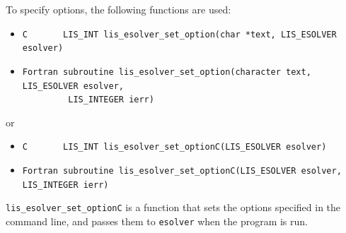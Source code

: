 \documentclass[a4paper]{article}
\begin{document}
To specify options, 
the following functions are used:
\begin{itemize}
\item \verb|C       LIS_INT lis_esolver_set_option(char *text, LIS_ESOLVER esolver)|
\item \verb|Fortran subroutine lis_esolver_set_option(character text, LIS_ESOLVER esolver,|\\
      \verb|         LIS_INTEGER ierr)|
\end{itemize}
or
\begin{itemize}
\item \verb|C       LIS_INT lis_esolver_set_optionC(LIS_ESOLVER esolver)|
\item \verb|Fortran subroutine lis_esolver_set_optionC(LIS_ESOLVER esolver, LIS_INTEGER ierr)|
\end{itemize}
\verb|lis_esolver_set_optionC| is a function that sets the options specified 
in the command line, and passes them to \verb|esolver| when the program is run. 
\end{document}
